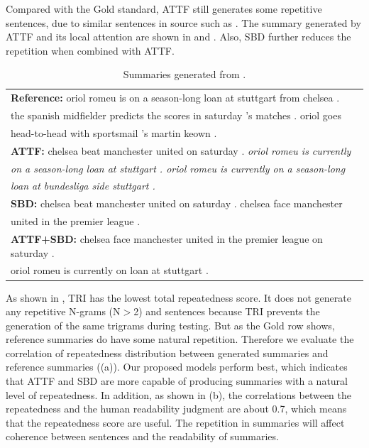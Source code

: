 Compared with the Gold standard,
ATTF still generates some repetitive sentences,
due to similar sentences in source
such as .
The summary generated by ATTF and its local attention are
shown in  and .
Also, SBD further reduces the repetition when combined with ATTF. 

\begin{table}[th!]
\begin{center}
\caption{Summaries generated from .}
\begin{tabular}{|l|}%
\hline \textbf{Reference:} oriol romeu is on a season-long loan at stuttgart from chelsea . \\
       the spanish midfielder predicts the scores in saturday 's matches . oriol goes \\
	   head-to-head with sportsmail 's martin keown .\\
\hline \textbf{ATTF:} chelsea beat manchester united on saturday . \textit{oriol romeu is currently} \\
       \textit{on a season-long loan at stuttgart . oriol romeu is currently on a season-long} \\
	   \textit{loan at bundesliga side stuttgart .}\\
\hline \textbf{SBD:} chelsea beat manchester united on saturday . chelsea face manchester \\
       united in the premier league . \\ 
\hline \textbf{ATTF+SBD:} chelsea face manchester united in the premier league on saturday . \\
       oriol romeu is currently on loan at stuttgart . \\
\hline
\end{tabular}
\end{center}
\label{tab:src_rep}
\end{table}

As shown in , TRI has the lowest total repeatedness score.
It does not generate any repetitive N-grams (N$>$2) and sentences 
because TRI prevents the generation of the same trigrams during testing.
But as the Gold row shows, reference summaries do have some natural repetition.
Therefore we evaluate the correlation of repeatedness distribution between
generated summaries and reference summaries ((a)).
Our proposed models perform best,
which indicates that ATTF and SBD are more capable of producing summaries with a natural level of repeatedness.
In addition, as shown in (b), the correlations between the repeatedness and the human readability judgment are about 0.7, which means that the repeatedness score are useful. The repetition in summaries will affect coherence between sentences and the readability of summaries.

